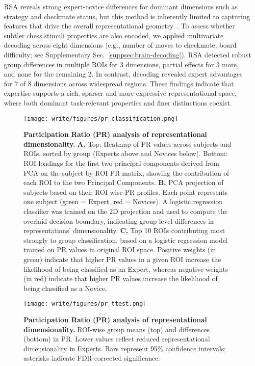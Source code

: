 \documentclass[preprint,12pt]{elsarticle}
\begin{document}
RSA reveals strong expert-novice differences for dominant dimensions such as strategy and checkmate status, but this method is inherently limited to capturing features that drive the overall representational geometry~\cite{kaniuth_feature-reweighted_2022}. To assess whether subtler chess stimuli properties are also encoded, we applied multivariate decoding across eight dimensions (e.g., number of moves to checkmate, board difficulty; see Supplementary Sec.~\ref{suppsec:brain-decoding}). RSA detected robust group differences in multiple ROIs for 3 dimensions, partial effects for 3 more, and none for the remaining 2. In contrast, decoding revealed expert advantages for 7 of 8 dimensions across widespread regions. These findings indicate that expertise supports a rich, sparser and more expressive representational space, where both dominant task-relevant properties and finer distinctions coexist.

\begin{figure}[!htp]
  \centering
  \texttt{[image: write/figures/pr\_classification.png]}
  \caption{ 
  \textbf{Participation Ratio (PR) analysis of representational dimensionality.} 
  \textbf{A.} Top: Heatmap of PR values across subjects and ROIs, sorted by group (Experts above and Novices below). Bottom: ROI loadings for the first two principal components derived from PCA on the subject-by-ROI PR matrix, showing the contribution of each ROI to the two Principal Components.
  \textbf{B.} PCA projection of subjects based on their ROI-wise PR profiles. Each point represents one subject (green = Expert, red = Novices).  A logistic regression classifier was trained on the 2D projection and used to compute the overlaid decision boundary, indicating group-level differences in representations' dimensionality. 
  \textbf{C.} Top 10 ROIs contributing most strongly to group classification, based on a logistic regression model trained on PR values in original ROI space. Positive weights (in green) indicate that higher PR values in a given ROI increase the likelihood of being classified as an Expert, whereas negative weights (in red) indicate that higher PR values increase the likelihood of being classified as a Novice.
  }
  \label{fig:pr_classification}
\end{figure}

\begin{figure}[!ht]
  \centering
  \texttt{[image: write/figures/pr\_ttest.png]}
  \caption{ 
  \textbf{Participation Ratio (PR) analysis of representational dimensionality.} 
  ROI-wise group means (top) and differences (bottom) in PR. Lower values reflect reduced representational dimensionality in Experts. Bars represent 95\% confidence intervals; asterisks indicate FDR-corrected significance. 
  }
  \label{fig:pr_ttest}
\end{figure}
\end{document}

